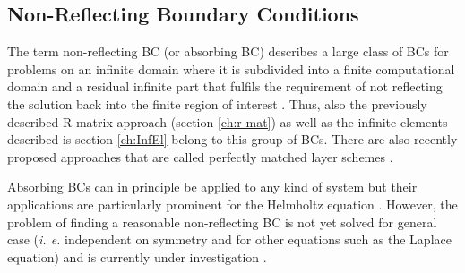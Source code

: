 \subsection{Non-Reflecting Boundary Conditions}
The term non-reflecting BC (or absorbing BC) describes a large class of BCs for problems on an infinite domain where it is subdivided into a finite computational domain and a residual infinite part that fulfils the requirement of not reflecting the solution back into the finite region of interest \cite{nrBCrev}.
Thus, also the previously described R-matrix approach (section \ref{ch:r-mat}) as well as the infinite elements described is section \ref{ch:InfEl} belong to this group of BCs.
There are also recently proposed approaches that are called perfectly matched layer schemes \cite{pmlBook,pml1, pml2}.

Absorbing BCs can in principle be applied to any kind of system but their applications are particularly prominent for the Helmholtz equation \cite{Engquist,HelmhPrec, nonreflectBC,nrBCrev}.
However, the problem of finding a reasonable non-reflecting BC is not yet solved for general case (\textit{i. e.} independent on symmetry and for other equations such as the Laplace equation) and is currently under investigation \cite{nonreflectBC,nrBCrev}.

